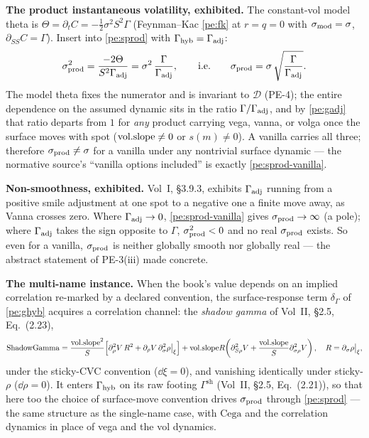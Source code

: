 \textbf{The product instantaneous volatility, exhibited.} The constant-vol model
theta is $\Theta = \partial_t C = -\tfrac12\sigma^2 S^2\Gamma$ (Feynman--Kac
\eqref{pe:fk} at $r=q=0$ with $\sigma_{\mathrm{mod}}=\sigma$, $\partial_{SS}C=\Gamma$). Insert
into \eqref{pe:sprod} with $\Gamma_{\mathrm{hyb}}=\Gamma_{\mathrm{adj}}$:
\begin{equation}\label{pe:sprod-vanilla}
  \sigma_{\mathrm{prod}}^2 = \frac{-2\Theta}{S^2\Gamma_{\mathrm{adj}}}
           = \sigma^2\,\frac{\Gamma}{\Gamma_{\mathrm{adj}}},
  \qquad\text{i.e.}\qquad
  \sigma_{\mathrm{prod}} = \sigma\,\sqrt{\frac{\Gamma}{\Gamma_{\mathrm{adj}}}} .
\end{equation}
The model theta fixes the numerator and is invariant to $\mathcal{D}$ (PE-4);
the entire dependence on the assumed dynamic sits in the ratio
$\Gamma/\Gamma_{\mathrm{adj}}$, and by \eqref{pe:gadj} that ratio departs from $1$ for
\emph{any} product carrying vega, vanna, or volga once the surface moves with
spot ($\mathrm{vol.slope}\neq0$ or $s(m)\neq0$). A vanilla carries all three; therefore
$\sigma_{\mathrm{prod}}\neq\sigma$ for a vanilla under any nontrivial surface dynamic --- the
normative source's ``vanilla options included'' is exactly \eqref{pe:sprod-vanilla}.

\textbf{Non-smoothness, exhibited.} Vol~I, \S3.9.3, exhibits $\Gamma_{\mathrm{adj}}$ running from a
positive smile adjustment at one spot to a negative one a finite move away, as
Vanna crosses zero. Where $\Gamma_{\mathrm{adj}}\to0$, \eqref{pe:sprod-vanilla}
gives $\sigma_{\mathrm{prod}}\to\infty$ (a pole); where $\Gamma_{\mathrm{adj}}$ takes the sign opposite to
$\Gamma$, $\sigma_{\mathrm{prod}}^2<0$ and no real $\sigma_{\mathrm{prod}}$ exists. So even for a vanilla,
$\sigma_{\mathrm{prod}}$ is neither globally smooth nor globally real --- the abstract statement
of PE-3(iii) made concrete.

\textbf{The multi-name instance.} When the book's value depends on an implied
correlation re-marked by a declared convention, the surface-response term
$\delta_\Gamma$ of \eqref{pe:ghyb} acquires a correlation channel: the
\emph{shadow gamma} of Vol~II, \S2.5, Eq.~(2.23),
\[
  \mathrm{ShadowGamma}
  = \frac{\mathrm{vol.slope}^2}{S}\!\left[\partial_\rho^2 V\,R^2
      + \partial_\rho V\,\partial_\sigma^2\rho\big|_\xi\right]
   + \mathrm{vol.slope} R\!\left(\partial^2_{S\rho}V
      + \frac{\mathrm{vol.slope}}{S}\partial^2_{\sigma\rho}V\right),
  \quad R=\partial_\sigma\rho\big|_\xi,
\]
under the sticky-CVC convention ($\dd\xi=0$), and vanishing identically under
sticky-$\rho$ ($\dd\rho=0$). It enters $\Gamma_{\mathrm{hyb}}$ on its raw footing
$\Gamma^{\mathrm{sh}}$ (Vol~II, \S2.5, Eq.~(2.21)), so that here too the choice
of surface-move convention drives $\sigma_{\mathrm{prod}}$ through \eqref{pe:sprod} --- the same
structure as the single-name case, with $\mathrm{Cega}$ and the correlation
dynamics in place of vega and the vol dynamics.

